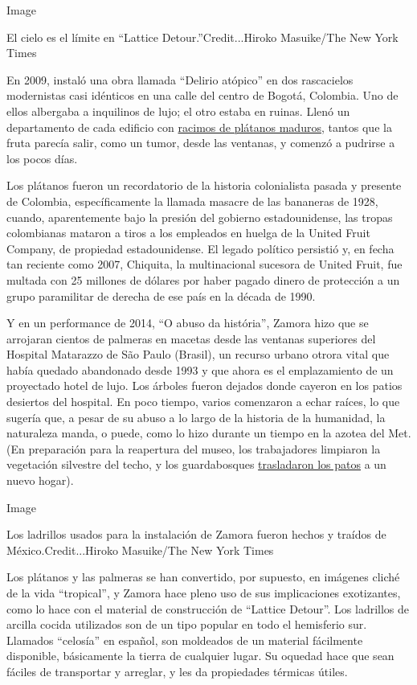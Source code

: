 Image

El cielo es el límite en ``Lattice Detour.''Credit...Hiroko Masuike/The
New York Times

En 2009, instaló una obra llamada ``Delirio atópico'' en dos rascacielos
modernistas casi idénticos en una calle del centro de Bogotá, Colombia.
Uno de ellos albergaba a inquilinos de lujo; el otro estaba en ruinas.
Llenó un departamento de cada edificio con
\href{https://www.oneart.org/galleries/hector-zamora-delirio-atopico-atopic-delirium}{racimos
de plátanos maduros}, tantos que la fruta parecía salir, como un tumor,
desde las ventanas, y comenzó a pudrirse a los pocos días.

Los plátanos fueron un recordatorio de la historia colonialista pasada y
presente de Colombia, específicamente la llamada masacre de las
bananeras de 1928, cuando, aparentemente bajo la presión del gobierno
estadounidense, las tropas colombianas mataron a tiros a los empleados
en huelga de la United Fruit Company, de propiedad estadounidense. El
legado político persistió y, en fecha tan reciente como 2007, Chiquita,
la multinacional sucesora de United Fruit, fue multada con 25 millones
de dólares por haber pagado dinero de protección a un grupo paramilitar
de derecha de ese país en la década de 1990.

Y en un performance de 2014, ``O abuso da história'', Zamora hizo que se
arrojaran cientos de palmeras en macetas desde las ventanas superiores
del Hospital Matarazzo de São Paulo (Brasil), un recurso urbano otrora
vital que había quedado abandonado desde 1993 y que ahora es el
emplazamiento de un proyectado hotel de lujo. Los árboles fueron dejados
donde cayeron en los patios desiertos del hospital. En poco tiempo,
varios comenzaron a echar raíces, lo que sugería que, a pesar de su
abuso a lo largo de la historia de la humanidad, la naturaleza manda, o
puede, como lo hizo durante un tiempo en la azotea del Met. (En
preparación para la reapertura del museo, los trabajadores limpiaron la
vegetación silvestre del techo, y los guardabosques
\href{https://www.instagram.com/p/CD_y4_vl9V1/}{trasladaron los patos} a
un nuevo hogar).

Image

Los ladrillos usados para la instalación de Zamora fueron hechos y
traídos de México.Credit...Hiroko Masuike/The New York Times

Los plátanos y las palmeras se han convertido, por supuesto, en imágenes
cliché de la vida ``tropical'', y Zamora hace pleno uso de sus
implicaciones exotizantes, como lo hace con el material de construcción
de ``Lattice Detour''. Los ladrillos de arcilla cocida utilizados son de
un tipo popular en todo el hemisferio sur. Llamados ``celosía'' en
español, son moldeados de un material fácilmente disponible, básicamente
la tierra de cualquier lugar. Su oquedad hace que sean fáciles de
transportar y arreglar, y les da propiedades térmicas útiles.

